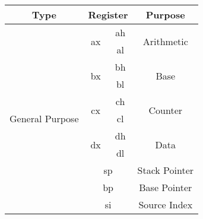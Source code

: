 \documentclass[11pt,a5paper,footinclude=true,headinclude=true]{scrbook} %
\begin{document}
\begin{center}
	\begin{tabular}{|c|c|c|c|}
		\hline
		Type                              & \multicolumn{2}{c|}{Register}            & Purpose                            \\\hline\hline
		\multirow{16}{*}{General Purpose} & \multirow{2}{*}{ax} & ah                 & \multirow{2}{*}{Arithmetic}        \\
		\cline{3-3}
		                                  &                     & al                 &                                    \\
		\cline{2-4}
		                                  & \multirow{2}{*}{bx} & bh                 & \multirow{2}{*}{Base}              \\
		\cline{3-3}
		                                  &                     & bl                 &                                    \\
		\cline{2-4}
		                                  & \multirow{2}{*}{cx} & ch                 & \multirow{2}{*}{Counter}           \\
		\cline{3-3}
		                                  &                     & cl                 &                                    \\
		\cline{2-4}
		                                  & \multirow{2}{*}{dx} & dh                 & \multirow{2}{*}{Data}              \\
		\cline{3-3}
		                                  &                     & dl                 &                                    \\
		\cline{2-4}
		                                  & \multicolumn{2}{c|}{\multirow{2}{*}{sp}} & \multirow{2}{*}{Stack Pointer}     \\
		                                  & \multicolumn{2}{c|}{}                    &                                    \\
		\cline{2-4}
		                                  & \multicolumn{2}{c|}{\multirow{2}{*}{bp}} & \multirow{2}{*}{Base Pointer}      \\
		                                  & \multicolumn{2}{c|}{}                    &                                    \\
		\cline{2-4}
		                                  & \multicolumn{2}{c|}{\multirow{2}{*}{si}} & \multirow{2}{*}{Source Index}      \\
		                                  & \multicolumn{2}{c|}{}                    &                                    \\

\end{tabular}
\end{center}
\end{document}
